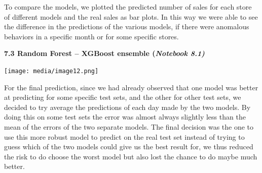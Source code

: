 \documentclass[]{article}
\begin{document}
To compare the models, we plotted the predicted number of sales for each
store of different models and the real sales as bar plots. In this way
we were able to see the difference in the predictions of the various
models, if there were anomalous behaviors in a specific month or for
some specific stores.

\textbf{7.3 Random Forest -- XGBoost ensemble (\emph{Notebook 8.1)}}

\texttt{[image: media/image12.png]}


For the final prediction, since we had already observed that one model was
better at predicting for some specific test sets, and the other for
other test sets, we decided to try average the predictions of each day
made by the two models. By doing this on some test sets the error was
almost always slightly less than the mean of the errors of the two
separate
models\protect\hypertarget{_kuf44nbv2f38}{}{\protect\hypertarget{_gjdgxs}{}{}}.
The final decision was the one to use this more robust model to predict
on the real test set instead of trying to guess which of the two models
could give us the best result for, we thus reduced the risk to do choose
the worst model but also lost the chance to do maybe much better.
\end{document}
